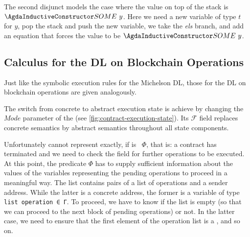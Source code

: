 The second disjunct models the case where the value on top of the stack is
$\ACon{SOME}~y$. Here we need a new variable of type $t$ for $y$, pop
the stack and push the new variable, we take the \emph{els} branch,
and add an equation that forces the value to be $\ACon{SOME}~y$.

\subsection{Calculus for the DL on Blockchain Operations}
\label{sec:calc-dl-blockch}

Just like the symbolic execution rules for the Michelson DL,
those for the DL on blockchain operations
are given analogously.
\AbstractUExecState
\AbstractAexecStep






The switch from concrete to abstract execution state is achieve by
changing the $Mode$ parameter of the  (see
\autoref{fig:contract-execution-state}). Its $\mathcal{F}$ field
replaces concrete semantics by abstract semantics throughout all state
components. 


Unfortunately  cannot represent 
exactly, if  is ~$\Phi$, that is: a
contract has terminated and we need to check the 
field for further operations to be executed. 
At this point, the predicate $\Phi$ has to supply sufficient information about the values of the variables
representing the pending operations to proceed in a meaningful way.
The  list contains pairs of a list of operations and a
sender address. While the latter is a concrete address, the former is
a variable of type \verb/list operation ∈ Γ/. To proceed, we have to
know if the list  is empty (so that we can proceed to the next block
of pending operations) or not. In the latter case, we need to ensure
that the first element of the operation list is a
, and so on.


